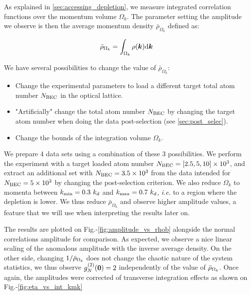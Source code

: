 As explained in \ref{sec:accessing_depletion}, we measure integrated correlation functions over the momentum volume $\Omega_k$. The parameter setting the amplitude we observe is then the average momentum density $\bar{\rho}_{\Omega_k}$ defined as:

\begin{equation}
    \bar{\rho}_{\Omega_k}=\int_{\Omega_{k}} \rho({\bm k}) {\rm d}{\bm k}
\end{equation}

We have several possibilities to change the value of $\bar{\rho}_{\Omega_k}$:

\begin{itemize}
    \item Change the experimental parameters to load a different target total atom number $N_{\rm{BEC}}$ in the optical lattice.
    \item "Artificially" change the total atom number $N_{\rm{BEC}}$ by changing the target atom number when doing the data post-selection (see \ref{sec:post_selec}).
    \item Change the bounds of the integration volume $\Omega_k$.
\end{itemize}

We prepare 4 data sets using a combination of these 3 possibilities. We perform the experiment with a target loaded atom number $N_{\rm{BEC}}=[2.5,5,10] \times 10^3$, and extract an additional set with $N_{\rm{BEC}}=3.5 \times 10^3$ from the data intended for $N_{\rm{BEC}} = 5 \times 10^3$ by changing the post-selection criterion. We also reduce $\Omega_k$ to momenta between $k_{\rm{min}} = 0.3 \ k_d$ and $k_{\rm{max}} = 0.7 \ k_d$, {\it i.e.} to a region where the depletion is lower. We thus reduce $\bar{\rho}_{\Omega_k}$ and observe higher amplitude values, a feature that we will use when interpreting the results later on.

The results are plotted on Fig.-\ref{fig:amplitude_vs_rhob} alongside the normal correlations amplitude for comparison. As expected, we observe a nice linear scaling of the anomalous amplitude with the inverse average density. On the other side, changing $1/\bar{\rho}_{\Omega_k}$ does not change the chaotic nature of the system statistics, we thus observe $g^{(2)}_N (\bm{0})=2$ independently of the value of $\bar{\rho}_{\Omega_k}$. Once again, the amplitudes were corrected of transverse integration effects as shown on Fig.-\ref{fig:eta_vs_int_kmk}

